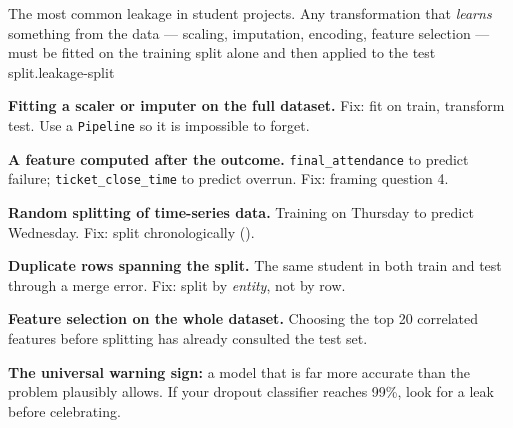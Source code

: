 {The most common leakage in student projects. Any transformation that \emph{learns}
something from the data --- scaling, imputation, encoding, feature selection --- must be
fitted on the training split alone and then applied to the test split.}{leakage-split}

\begin{pitfall}
\begin{tight}
  \item \textbf{Fitting a scaler or imputer on the full dataset.} Fix: fit on train,
        transform test. Use a \texttt{Pipeline} so it is impossible to forget.
  \item \textbf{A feature computed after the outcome.}
        \texttt{final\_attendance} to predict failure; \texttt{ticket\_close\_time}
        to predict overrun. Fix: framing question 4.
  \item \textbf{Random splitting of time-series data.} Training on Thursday to
        predict Wednesday. Fix: split chronologically ().
  \item \textbf{Duplicate rows spanning the split.} The same student in both train
        and test through a merge error. Fix: split by \emph{entity}, not by row.
  \item \textbf{Feature selection on the whole dataset.} Choosing the top 20
        correlated features before splitting has already consulted the test set.
\end{tight}
\textbf{The universal warning sign:} a model that is far more accurate than the
problem plausibly allows. If your dropout classifier reaches 99\%, look for a
leak before celebrating.
\end{pitfall}

